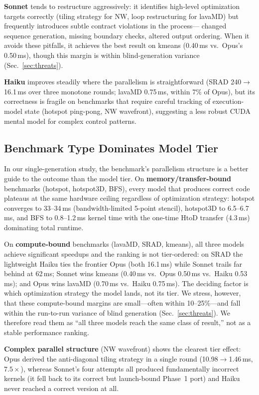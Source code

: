 \documentclass[conference]{IEEEtran}
\begin{document}
\textbf{Sonnet} tends to restructure aggressively: it identifies high-level
optimization targets correctly (tiling strategy for NW, loop restructuring for
lavaMD) but frequently introduces subtle contract violations in the process---
changed sequence generation, missing boundary checks, altered output ordering.
When it avoids these pitfalls, it achieves the best result on kmeans
(0.40\,ms vs.\ Opus's 0.50\,ms), though this margin is within blind-generation
variance (Sec.~\ref{sec:threats}).

\textbf{Haiku} improves steadily where the parallelism is straightforward
(SRAD 240$\to$16.1\,ms over three monotone rounds; lavaMD 0.75\,ms, within 7\%
of Opus), but its correctness is fragile on benchmarks that require careful
tracking of execution-model state (hotspot ping-pong, NW wavefront), suggesting
a less robust CUDA mental model for complex control patterns.

\subsection{Benchmark Type Dominates Model Tier}

In our single-generation study, the benchmark's parallelism structure is a
better guide to the outcome than the model tier. On
\textbf{memory/transfer-bound} benchmarks (hotspot, hotspot3D, BFS),
every model that produces correct code plateaus at the same hardware ceiling
regardless of optimization strategy: hotspot converges to 33--34\,ms
(bandwidth-limited 5-point stencil), hotspot3D to 6.5--6.7\,ms, and BFS to
0.8--1.2\,ms kernel time with the one-time HtoD transfer (4.3\,ms) dominating
total runtime.

On \textbf{compute-bound} benchmarks (lavaMD, SRAD, kmeans), all three models
achieve significant speedups and the ranking is not tier-ordered: on SRAD the
lightweight Haiku ties the frontier Opus (both 16.1\,ms) while Sonnet trails far
behind at 62\,ms; Sonnet wins kmeans (0.40\,ms vs.\ Opus 0.50\,ms vs.\ Haiku
0.53\,ms); and Opus wins lavaMD (0.70\,ms vs.\ Haiku 0.75\,ms). The deciding
factor is which optimization strategy the model lands, not its tier. We stress,
however, that these compute-bound margins are small---often within 10--25\%---and
fall within the run-to-run variance of blind generation (Sec.~\ref{sec:threats}).
We therefore read them as ``all three models reach the same class of result,''
not as a stable performance ranking.

\textbf{Complex parallel structure} (NW wavefront) shows the clearest
tier effect: Opus derived the anti-diagonal tiling strategy in a single round
(10.98$\to$1.46\,ms, $7.5\times$), whereas Sonnet's four attempts all produced
fundamentally incorrect kernels (it fell back to its correct but launch-bound
Phase~1 port) and Haiku never reached a correct version at all.
\end{document}
